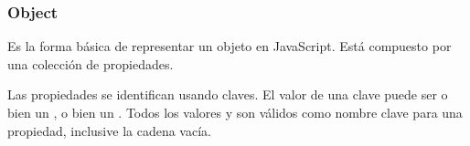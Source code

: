 \subsubsection{Object} 
Es la forma básica de representar un objeto en JavaScript. Está compuesto por una colección de propiedades.

Las propiedades se identifican usando claves. El valor de una clave puede ser o bien un , o bien un . Todos los valores  y  son válidos como nombre clave para una propiedad, inclusive la cadena vacía. 
